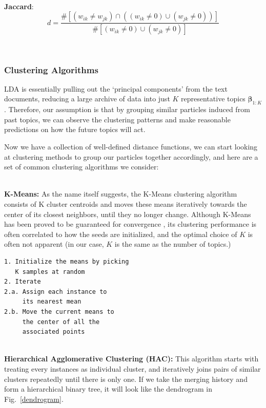 \documentclass[conference]{IEEEtran}
\begin{document}
\-\\
\textbf{Jaccard}: 
\begin{equation*}
	d = \frac{\# \left[(w_{ik} \neq w_{jk})\cap((w_{ik} \neq 0)\cup(w_{jk} \neq 0))\right]}{\#\left[(w_{ik} \neq 0)\cup(w_{jk} \neq 0)\right]}
\end{equation*}

\-\\

\subsubsection{Clustering Algorithms}
LDA is essentially pulling out the `principal components' from the text documents, reducing a large archive of data into just $K$ representative topics $\mathbf{\beta}_{1:K}$. Therefore, our assumption is that by grouping similar particles induced from past topics, we can observe the clustering patterns and make reasonable predictions on how the future topics will act.

Now we have a collection of well-defined distance functions, we can start looking at clustering methods to group our particles together accordingly, and here are a set of common clustering algorithms we consider:

\-\\
\textbf{K-Means:} As the name itself suggests, the K-Means clustering algorithm consists of K cluster centroids and moves these means iteratively towards the center of its closest neighbors, until they no longer change. Although K-Means has been proved to be guaranteed for convergence \cite{selim1984}, its clustering performance is often correlated to how the seeds are initialized, and the optimal choice of $K$ is often not apparent (in our case, $K$ is the same as the number of topics.)

\begin{verbatim}
1. Initialize the means by picking 
   K samples at random
2. Iterate
2.a. Assign each instance to 
     its nearest mean
2.b. Move the current means to 
	 the center of all the 
	 associated points
\end{verbatim}
\-\\
\textbf{Hierarchical Agglomerative Clustering (HAC):} This algorithm starts with treating every instances as individual cluster, and iteratively joins pairs of similar clusters repeatedly until there is only one. If we take the merging history and form a hierarchical binary tree, it will look like the dendrogram in Fig.~\ref{dendrogram}.
\end{document}
